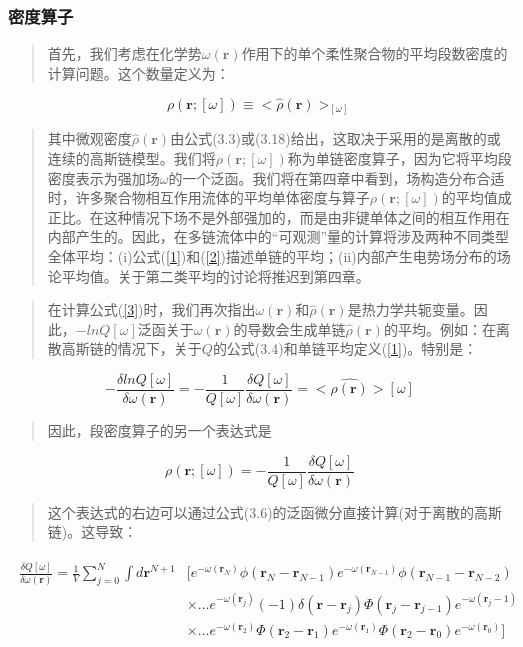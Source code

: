 \subsubsection{密度算子}
\begin{quotation}
首先，我们考虑在化学势$\omega(\mathbf{r})$作用下的单个柔性聚合物的平均段数密度的计算问题。这个数量定义为：
\end{quotation}
\begin{equation}\label{3}
\rho(\mathbf{r};[\omega])\equiv<\hat{\rho}(\mathbf{r})>_{[\omega]}
\end{equation}
\begin{quotation}
其中微观密度$\hat{\rho}(\mathbf{r})$由公式(3.3)或(3.18)给出，这取决于采用的是离散的或连续的高斯链模型。我们将$\rho(\mathbf{r};[\omega])$称为单链密度算子，因为它将平均段密度表示为强加场$\omega$的一个泛函。我们将在第四章中看到，场构造分布合适时，许多聚合物相互作用流体的平均单体密度与算子$\rho(\mathbf{r};[\omega])$的平均值成正比。在这种情况下场不是外部强加的，而是由非键单体之间的相互作用在内部产生的。因此，在多链流体中的“可观测”量的计算将涉及两种不同类型全体平均：(i)公式(\ref{1})和(\ref{2})描述单链的平均；(ii)内部产生电势场分布的场论平均值。关于第二类平均的讨论将推迟到第四章。
\end{quotation}
\begin{quotation}
在计算公式(\ref{3})时，我们再次指出$\omega(\mathbf{r})$和$\hat{\rho}(\mathbf{r})$是热力学共轭变量。因此，$-lnQ[\omega]$泛函关于$\omega(\mathbf{r})$的导数会生成单链$\hat{\rho}(\mathbf{r})$的平均。例如：在离散高斯链的情况下，关于$Q$的公式(3.4)和单链平均定义(\ref{1})。特别是：
\end{quotation}
\begin{equation}\label{4}
-\frac{\delta lnQ[\omega]}{\delta \omega(\mathbf{r})}=-\frac{1}{Q[\omega]}\frac{\delta Q[\omega]}{\delta \omega(\mathbf{r})}=<\hat{\rho(\mathbf{r})}>[\omega]
\end{equation}
\begin{quotation}
因此，段密度算子的另一个表达式是
\end{quotation}
\begin{equation}\label{5}
\rho(\mathbf{r};[\omega])=-\frac{1}{Q[\omega]}\frac{\delta Q[\omega]}{\delta \omega(\mathbf{r})}
\end{equation}
\begin{quotation}
这个表达式的右边可以通过公式(3.6)的泛函微分直接计算(对于离散的高斯链)。这导致：
\end{quotation}
\begin{align}\label{6}
\begin{split}
\frac{\delta Q[\omega]}{\delta \omega(\mathbf{r})}=\frac{1}{V}\sum_{j=0}^{N}\int d\mathbf{r}^{N+1}&[e^{-\omega(\mathbf{r}_{N})}\phi(\mathbf{r}_{N}-\mathbf{r}_{N-1})e^{-\omega(\mathbf{r}_{N-1})}\phi(\mathbf{r}_{N-1}-\mathbf{r}_{N-2}) \\ &\times \ldots e^{-\omega(\mathbf{r}_{j})}(-1)\delta(\mathbf{r}-\mathbf{r}_j)\Phi(\mathbf{r}_j-\mathbf{r}_{j-1})e^{-\omega(\mathbf{r}_j-1)}\\ & \times \ldots e^{-\omega(\mathbf{r}_{2})}\Phi(\mathbf{r}_{2}-\mathbf{r}_{1})e^{-\omega(\mathbf{r}_{1})}\Phi(\mathbf{r}_{2}-\mathbf{r}_{0})e^{-\omega(\mathbf{r}_{0})}]
\end{split}
\end{align}
